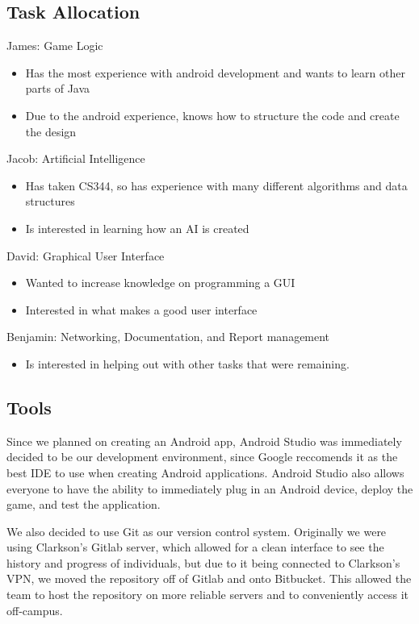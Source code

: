 \documentclass{article}
\begin{document}
\subsection{Task Allocation}
James: Game Logic
\begin{itemize}
  \item Has the most experience with android development and wants to learn other parts of Java
  \item Due to the android experience, knows how to structure the code and create the design
\end{itemize}
Jacob: Artificial Intelligence
\begin{itemize}
  \item Has taken CS344, so has experience with many different algorithms and data structures
  \item Is interested in learning how an AI is created
\end{itemize}
David: Graphical User Interface
\begin{itemize}
  \item Wanted to increase knowledge on programming a GUI
  \item Interested in what makes a good user interface
\end{itemize}
Benjamin: Networking, Documentation, and Report management
\begin{itemize}
  \item Is interested in helping out with other tasks that were remaining.
\end{itemize}

\subsection{Tools}
	Since we planned on creating an Android app, Android Studio was immediately decided to be our development environment, since Google reccomends it as the best IDE to use when creating Android applications. Android Studio also allows everyone to have the ability to immediately plug in an Android device, deploy the game, and test the application.\par 
	We also decided to use Git as our version control system. Originally we were using Clarkson's Gitlab server, which allowed for a clean interface to see the history and progress of individuals, but due to it being connected to Clarkson's VPN, we moved the repository off of Gitlab and onto Bitbucket. This allowed the team to host the repository on more reliable servers and to conveniently access it off-campus.
\end{document}
